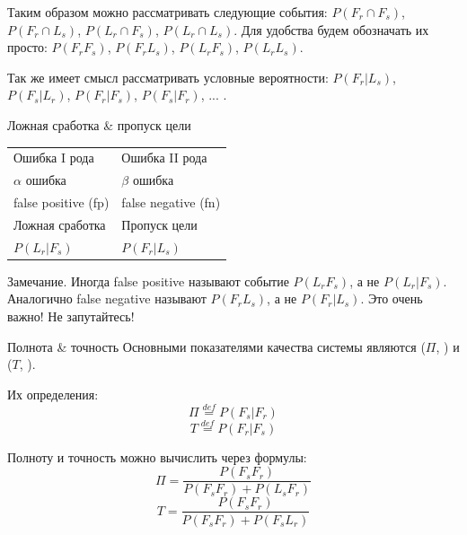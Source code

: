   \begin{frame}
  Таким образом можно рассматривать следующие события: 
  $P(F_r \cap F_s)$, $P(F_r \cap L_s)$, $P(L_r \cap F_s)$, $P(L_r \cap L_s)$. 
  Для удобства будем обозначать их просто: 
  $P(F_r  F_s)$, $P(F_r L_s)$, $P(L_r F_s)$, $P(L_r L_s)$. 
  
  Так же имеет смысл рассматривать условные вероятности: 
  $P(F_r | L_s)$,
  $P(F_s | L_r)$,
  $P(F_r | F_s)$, 
  $P(F_s | F_r)$, ... .
  \end{frame}

  \begin{frame}{Ложная сработка \& пропуск цели} 
  \begin{center}
		\LARGE
		\begin{tabular}{l|l}
		 	Ошибка I рода & Ошибка II рода \\
		 	$\alpha$ ошибка & $\beta$ ошибка \\
		 	false positive (fp) & false negative (fn) \\ 
		 	Ложная сработка  & Пропуск цели \\
		 	$P(L_r|F_s)$ & $P(F_r |L_s)$\\
		\end{tabular}
  \end{center}
   
    \begin{block}{Замечание.}
 	Иногда false positive называют событие $P(L_r F_s)$, а не $P(L_r | F_s)$.
 	Аналогично false negative называют $P(F_r  L_s)$, а не $P(F_r | L_s)$.
 	Это очень важно! Не запутайтесь!
    \end{block}
  \end{frame}
 
  \begin{frame}{Полнота \& точность}\label{frame:presicion_recall}
  Основными показателями качества системы являются 
   ($\Pi$, ) 
  и 
   ($T$, ).
  
  Их определения:
  \begin{equation}
  \Pi \stackrel{def}{=} P(F_s | F_r)
  \end{equation}
  \begin{equation}
  T \stackrel{def}{=} P(F_r | F_s)
  \end{equation}
  
  Полноту и точность можно вычислить через формулы:
  \begin{equation}\label{eq:recall_calc}
  \Pi = \frac{P(F_s  F_r)}{P(F_s F_r) + P(L_s F_r)}
  \end{equation}
  \begin{equation}\label{eq:precision_calc}
  T = \frac{P(F_s F_r)}{P(F_s F_r) + P(F_s L_r)}
  \end{equation}
  
  \end{frame}
  
